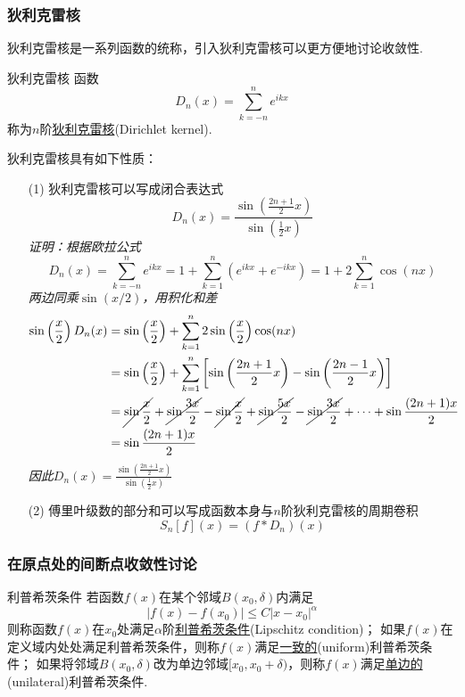 \documentclass[main.tex]{subfiles}
\begin{document}
\subsubsection{狄利克雷核}

狄利克雷核是一系列函数的统称，引入狄利克雷核可以更方便地讨论收敛性.

\begin{definition}{狄利克雷核}
    函数
    \[D_n(x) = \sum_{k=-n}^{n}e^{ikx}\]
    称为\(n\)阶\uline{狄利克雷核}(Dirichlet kernel).
\end{definition}

狄利克雷核具有如下性质：
\begin{itemize}
    \item [(1)] 狄利克雷核可以写成闭合表达式
    \[D_n(x)=\frac{\sin\left(\frac{2n+1}{2}x\right)}{\sin\left(\frac{1}{2}x\right)}\]
    \textit{
        证明：根据欧拉公式
        \[D_n(x) = \sum_{k=-n}^{n}e^{ikx} = 1+\sum_{k=1}^{n}(e^{ikx}+e^{-ikx}) = 1+2\sum_{k=1}^{n}\cos(nx)\]
        两边同乘\(\sin(x/2)\)，用积化和差
        \begin{align*}
            \sin\left(\frac{x}{2}\right)D_n(x) &= \sin\left(\frac{x}{2}\right)+\sum_{k=1}^{n}2\sin\left(\frac{x}{2}\right)\cos(nx) \\
            &= \sin\left(\frac{x}{2}\right)+\sum_{k=1}^{n}\left[\sin\left(\frac{2n+1}{2}x\right)-\sin\left(\frac{2n-1}{2}x\right)\right] \\
            &= \cancel{\sin\frac{x}{2}}+\cancel{\sin\frac{3x}{2}}-\cancel{\sin\frac{x}{2}}+\cancel{\sin\frac{5x}{2}}-\cancel{\sin\frac{3x}{2}}+\cdots+\sin\frac{(2n+1)x}{2} \\
            &= \sin\frac{(2n+1)x}{2}
        \end{align*}
        因此\(\displaystyle{D_n(x)=\frac{\sin\left(\frac{2n+1}{2}x\right)}{\sin\left(\frac{1}{2}x\right)}}\)
    }
    \item [(2)] 傅里叶级数的部分和可以写成函数本身与\(n\)阶狄利克雷核的周期卷积
    \[S_n[f](x) = (f*D_n)(x)\]
\end{itemize}

\subsubsection{在原点处的间断点收敛性讨论}

\begin{definition}{利普希茨条件}
    若函数\(f(x)\)在某个邻域\(B(x_0,\delta)\)内满足
    \[|f(x)-f(x_0)| \leq C|x-x_0|^\alpha\]
    则称函数\(f(x)\)在\(x_0\)处满足\(\alpha\)阶\uline{利普希茨条件}(Lipschitz condition)；
    \newline
    如果\(f(x)\)在定义域内处处满足利普希茨条件，则称\(f(x)\)满足\uline{一致的}(uniform)利普希茨条件；
    \newline
    如果将邻域\(B(x_0,\delta)\)改为单边邻域\([x_0,x_0+\delta)\)，则称\(f(x)\)满足\uline{单边的}(unilateral)利普希茨条件.
\end{definition}
\end{document}
